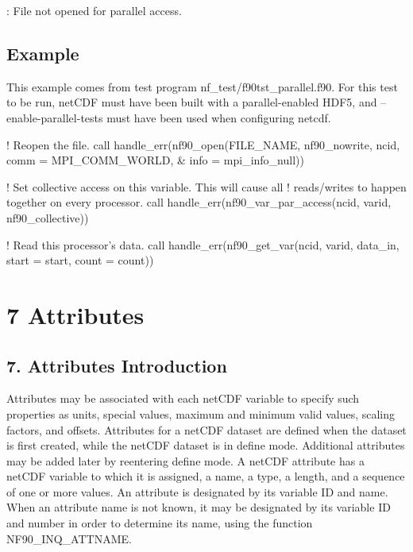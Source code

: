 \+: File not opened for parallel access.

\subsection*{Example}

This example comes from test program nf\+\_\+test/f90tst\+\_\+parallel.\+f90. For this test to be run, net\+C\+DF must have been built with a parallel-\/enabled H\+D\+F5, and –enable-\/parallel-\/tests must have been used when configuring netcdf.


\begin{DoxyCode}
\textcolor{comment}{! Reopen the file.}
\textcolor{comment}{call handle\_err(nf90\_open(FILE\_NAME, nf90\_nowrite, ncid, comm = MPI\_COMM\_WORLD, &}
     info = mpi\_info\_null))

\textcolor{comment}{! Set collective access on this variable. This will cause all}
\textcolor{comment}{! reads/writes to happen together on every processor.}
\textcolor{comment}{call handle\_err(nf90\_var\_par\_access(ncid, varid, nf90\_collective))}

\textcolor{comment}{! Read this processor's data.}
\textcolor{comment}{call handle\_err(nf90\_get\_var(ncid, varid, data\_in, start = start, count = count))}
\end{DoxyCode}
 \hypertarget{f90-attributes}{}\section{7 Attributes}\label{f90-attributes}
\hypertarget{f90-attributes_f90-attributes-introduction}{}\subsection{7. Attributes Introduction }\label{f90-attributes_f90-attributes-introduction}
Attributes may be associated with each net\+C\+DF variable to specify such properties as units, special values, maximum and minimum valid values, scaling factors, and offsets. Attributes for a net\+C\+DF dataset are defined when the dataset is first created, while the net\+C\+DF dataset is in define mode. Additional attributes may be added later by reentering define mode. A net\+C\+DF attribute has a net\+C\+DF variable to which it is assigned, a name, a type, a length, and a sequence of one or more values. An attribute is designated by its variable ID and name. When an attribute name is not known, it may be designated by its variable ID and number in order to determine its name, using the function N\+F90\+\_\+\+I\+N\+Q\+\_\+\+A\+T\+T\+N\+A\+ME.

